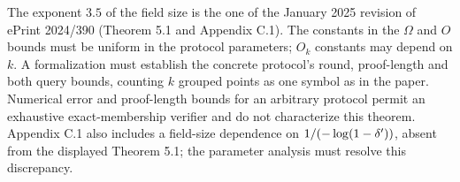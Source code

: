\begin{remark}
The exponent $3.5$ of the field size is the one of the January 2025 revision of ePrint 2024/390
\cite{ACFY24stir} (Theorem 5.1 and Appendix C.1). The constants in the $\Omega$ and $O$ bounds must
be uniform in the protocol parameters; $O_k$ constants may depend on $k$.
A formalization must establish the concrete protocol's round, proof-length and both query bounds,
counting $k$ grouped points as one symbol as in the paper. Numerical error and proof-length bounds
for an arbitrary protocol permit an exhaustive exact-membership verifier and do not characterize
this theorem. Appendix C.1 also includes a field-size dependence on
$1/(-\log(1-\delta'))$, absent from the displayed Theorem 5.1; the parameter analysis must
resolve this discrepancy.
\end{remark}

